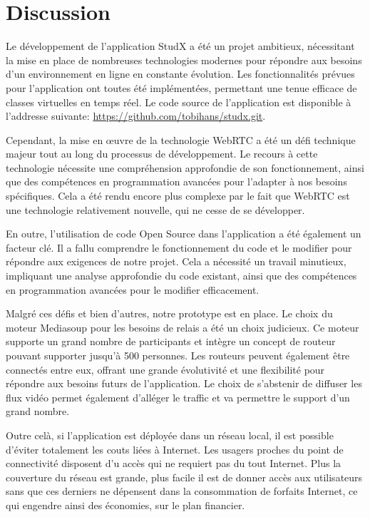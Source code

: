 \section{Discussion}
Le développement de l'application StudX a été un projet ambitieux, 
nécessitant la mise en place de nombreuses technologies modernes pour 
répondre aux besoins d'un environnement en ligne en constante évolution. 
Les fonctionnalités prévues pour l'application ont toutes été implémentées, 
permettant une tenue efficace de classes virtuelles en temps réel. Le code source de l'application
est disponible à l'addresse suivante: \url{https://github.com/tobihans/studx.git}.


Cependant, la mise en œuvre de la technologie WebRTC a été un défi technique majeur 
tout au long du processus de développement. Le recours à cette technologie nécessite
une compréhension approfondie de son fonctionnement, ainsi que des compétences en 
programmation avancées pour l'adapter à nos besoins spécifiques. Cela a été rendu 
encore plus complexe par le fait que WebRTC est une technologie relativement nouvelle, 
qui ne cesse de se développer.


En outre, l'utilisation de code Open Source dans l'application a été également un facteur clé. 
Il a fallu comprendre le fonctionnement du code et le modifier pour répondre aux exigences de notre projet. 
Cela a nécessité un travail minutieux, impliquant une analyse approfondie du code existant, ainsi 
que des compétences en programmation avancées pour le modifier efficacement.

Malgré ces défis et bien d'autres, notre prototype est en place. Le choix du moteur Mediasoup pour les besoins de relais a été un choix judicieux. 
Ce moteur supporte un grand nombre de participants et intègre un concept de routeur pouvant supporter jusqu'à 500 personnes. 
Les routeurs peuvent également être connectés entre eux, offrant une grande évolutivité et une flexibilité pour répondre aux besoins futurs de l'application.
Le choix de s'abstenir de diffuser les flux vidéo permet également d'alléger le traffic et va permettre le support d'un grand nombre.

Outre celà, si l'application est déployée dans un réseau local, il est possible d'éviter totalement les couts liées à Internet.
Les usagers proches du point de connectivité disposent d'u accès qui ne requiert pas du tout Internet. Plus la couverture du réseau est grande, plus facile
il est de donner accès aux utilisateurs sans que ces derniers ne dépensent dans la consommation
de forfaits Internet, ce qui engendre ainsi des économies, sur le plan financier. 

